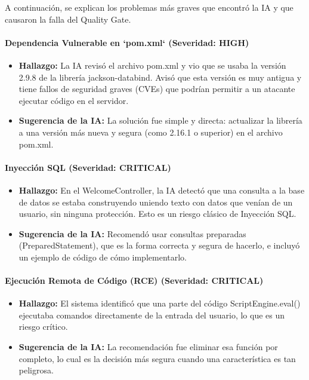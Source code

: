 A continuación, se explican los problemas más graves que encontró la IA y que causaron la falla del Quality Gate.

\paragraph{Dependencia Vulnerable en `pom.xml` (Severidad: HIGH)}
\begin{itemize}
    \item \textbf{Hallazgo:} La IA revisó el archivo pom.xml y vio que se usaba la versión 2.9.8 de la librería jackson-databind. Avisó que esta versión es muy antigua y tiene fallos de seguridad graves (CVEs) que podrían permitir a un atacante ejecutar código en el servidor.
    \item \textbf{Sugerencia de la IA:} La solución fue simple y directa: actualizar la librería a una versión más nueva y segura (como 2.16.1 o superior) en el archivo pom.xml.
\end{itemize}

\paragraph{Inyección SQL (Severidad: CRITICAL)}
\begin{itemize}
    \item \textbf{Hallazgo:} En el WelcomeController, la IA detectó que una consulta a la base de datos se estaba construyendo uniendo texto con datos que venían de un usuario, sin ninguna protección. Esto es un riesgo clásico de Inyección SQL.
    \item \textbf{Sugerencia de la IA:} Recomendó usar consultas preparadas (PreparedStatement), que es la forma correcta y segura de hacerlo, e incluyó un ejemplo de código de cómo implementarlo.
\end{itemize}

\paragraph{Ejecución Remota de Código (RCE) (Severidad: CRITICAL)}
\begin{itemize}
    \item \textbf{Hallazgo:} El sistema identificó que una parte del código ScriptEngine.eval() ejecutaba comandos directamente de la entrada del usuario, lo que es un riesgo crítico.
    \item \textbf{Sugerencia de la IA:} La recomendación fue eliminar esa función por completo, lo cual es la decisión más segura cuando una característica es tan peligrosa.
\end{itemize}

